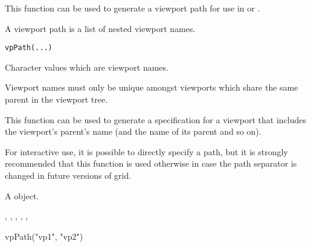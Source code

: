 %
\begin{Description}\relax
This function can be used to generate a viewport path for use
in  or .

A viewport path is a list of nested viewport names.
\end{Description}
%
\begin{Usage}
\begin{verbatim}
vpPath(...)
\end{verbatim}
\end{Usage}
%
\begin{Arguments}
\begin{ldescription}
\item[\code{...}]  Character values which are viewport names. 
\end{ldescription}
\end{Arguments}
%
\begin{Details}\relax
Viewport names must only be unique amongst viewports which
share the same parent in the viewport tree.

This function can be used to generate a specification for
a viewport that includes the viewport's parent's name
(and the name of its parent and so on).

For interactive use, it is possible to directly specify
a path, but it is strongly recommended that this function
is used otherwise in case the path separator is changed
in future versions of grid.
\end{Details}
%
\begin{Value}
A  object.
\end{Value}
%
\begin{SeeAlso}\relax
{},
,
,
,
,
\end{SeeAlso}
%
\begin{Examples}
\begin{ExampleCode}
vpPath("vp1", "vp2")
\end{ExampleCode}
\end{Examples}
